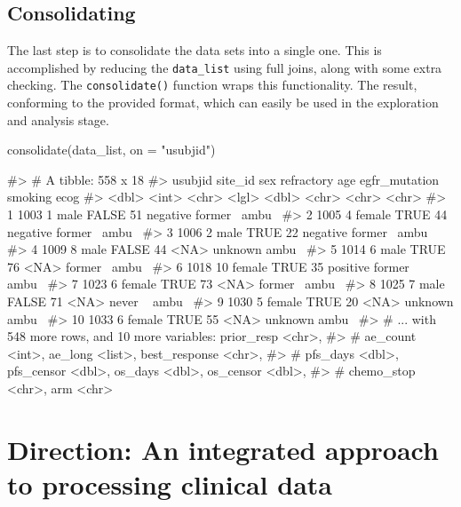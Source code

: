\hypertarget{consolidating}{%
\subsection{Consolidating}\label{consolidating}}

The last step is to consolidate the data sets into a single one. This is
accomplished by reducing the \texttt{data\_list} using full joins, along
with some extra checking. The \texttt{consolidate()} function wraps this
functionality. The result, conforming to the provided format, which can
easily be used in the exploration and analysis stage.

\begin{Schunk}
\begin{Sinput}
consolidate(data_list, on = "usubjid")
\end{Sinput}
\begin{Soutput}
#> # A tibble: 558 x 18
#>    usubjid site_id sex    refractory   age egfr_mutation smoking ecog 
#>      <dbl>   <int> <chr>  <lgl>      <dbl> <chr>         <chr>   <chr>
#>  1    1003       1 male   FALSE         51 negative      former~ ambu~
#>  2    1005       4 female TRUE          44 negative      former~ ambu~
#>  3    1006       2 male   TRUE          22 negative      former~ ambu~
#>  4    1009       8 male   FALSE         44 <NA>          unknown ambu~
#>  5    1014       6 male   TRUE          76 <NA>          former~ ambu~
#>  6    1018      10 female TRUE          35 positive      former~ ambu~
#>  7    1023       6 female TRUE          73 <NA>          former~ ambu~
#>  8    1025       7 male   FALSE         71 <NA>          never ~ ambu~
#>  9    1030       5 female TRUE          20 <NA>          unknown ambu~
#> 10    1033       6 female TRUE          55 <NA>          unknown ambu~
#> # ... with 548 more rows, and 10 more variables: prior_resp <chr>,
#> #   ae_count <int>, ae_long <list>, best_response <chr>,
#> #   pfs_days <dbl>, pfs_censor <dbl>, os_days <dbl>, os_censor <dbl>,
#> #   chemo_stop <chr>, arm <chr>
\end{Soutput}
\end{Schunk}

\hypertarget{direction-an-integrated-approach-to-processing-clinical-data}{%
\section{Direction: An integrated approach to processing clinical
data}\label{direction-an-integrated-approach-to-processing-clinical-data}}

